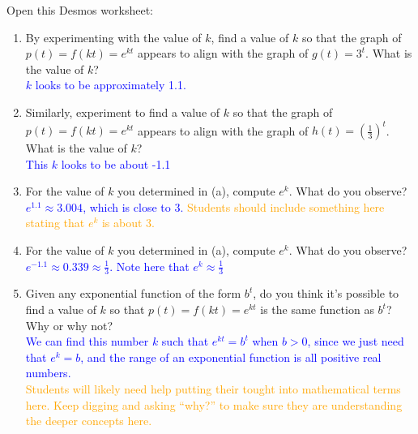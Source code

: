 \documentclass{ximera}
\begin{document}
\begin{exercise}
    Open this Desmos worksheet: \\
    \begin{center}
    \end{center}

    \begin{enumerate}
        \item By experimenting with the value of $k$, find a value of $k$ so that the graph of $p(t)=f(kt)=e^{kt}$ appears to align with the graph of $g(t)=3^t$.  What is the value of $k$?\\
        \textcolor{blue}{ $k$ looks to be approximately 1.1.}

        \item Similarly, experiment to find a value of $k$ so that the graph of $p(t)=f(kt)=e^{kt}$ appears to align with the graph of $h(t)=(\frac13)^t$.  What is the value of $k$?\\
        \textcolor{blue}{ This $k$ looks to be about -1.1}

        \item For the value of $k$ you determined in (a), compute $e^k$.  What do you observe? \\
        \textcolor{blue}{ $e^{1.1}\approx 3.004$, which is close to 3.  }
        \textcolor{orange}{Students should include something here stating that $e^k$ is about 3. }
   
        \item For the value of $k$ you determined in (a), compute $e^k$.  What do you observe?  \\
        \textcolor{blue}{ $e^{-1.1}\approx 0.339\approx \frac13$.  Note here that $e^k\approx \frac{1}{3}$}
   
        \item Given any exponential function of the form $b^t$, do you think it's possible to find a value of $k$ so that $p(t)=f(kt)=e^{kt}$ is the same function as $b^t$?  Why or why not?\\
        \textcolor{blue}{ We can find this number $k$ such that $e^{kt}=b^t$ when $b>0$, since we just need that $e^k=b$, and the range of an exponential function is all positive real numbers.}\\
        \textcolor{orange}{Students will likely need help putting their tought into mathematical terms here.  Keep digging and asking ``why?'' to make sure they are understanding the deeper concepts here.}
   

\end{enumerate}
\end{exercise}
\end{document}
